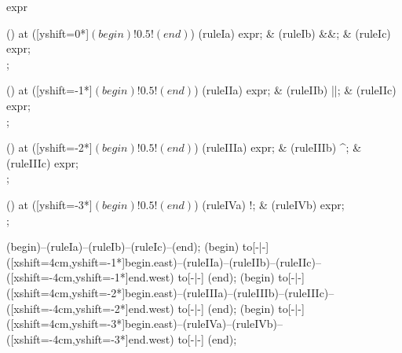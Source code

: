 \begin{syntax}{expr}
  
  \node[sequence] () at ([yshift=0*\syntaxruledist]$(begin)!0.5!(end)$) {
    \node[nonterminal] (ruleIa) {expr};
    &
    \node[terminal]    (ruleIb) {\&\&};
    &
    \node[nonterminal] (ruleIc) {expr};
    \\
  };
  
  \node[sequence] () at ([yshift=-1*\syntaxruledist]$(begin)!0.5!(end)$) {
    \node[nonterminal] (ruleIIa) {expr};
    &
    \node[terminal]    (ruleIIb) {||};
    &
    \node[nonterminal] (ruleIIc) {expr};
    \\
  };
  
  \node[sequence] () at ([yshift=-2*\syntaxruledist]$(begin)!0.5!(end)$) {
    \node[nonterminal] (ruleIIIa) {expr};
    &
    \node[terminal]    (ruleIIIb) {\^{}};
    &
    \node[nonterminal] (ruleIIIc) {expr};
    \\
  };
  
  \node[sequence] () at ([yshift=-3*\syntaxruledist]$(begin)!0.5!(end)$) {
    \node[terminal]    (ruleIVa) {!};
    &
    \node[nonterminal] (ruleIVb) {expr};
    \\
  };
  
  \draw[path] (begin)--(ruleIa)--(ruleIb)--(ruleIc)--(end);
  \draw[path] (begin) to[-|-] ([xshift=4cm,yshift=-1*\syntaxruledist]begin.east)--(ruleIIa)--(ruleIIb)--(ruleIIc)--([xshift=-4cm,yshift=-1*\syntaxruledist]end.west) to[-|-] (end);
  \draw[path] (begin) to[-|-] ([xshift=4cm,yshift=-2*\syntaxruledist]begin.east)--(ruleIIIa)--(ruleIIIb)--(ruleIIIc)--([xshift=-4cm,yshift=-2*\syntaxruledist]end.west) to[-|-] (end);
  \draw[path] (begin) to[-|-] ([xshift=4cm,yshift=-3*\syntaxruledist]begin.east)--(ruleIVa)--(ruleIVb)--([xshift=-4cm,yshift=-3*\syntaxruledist]end.west) to[-|-] (end);
\end{syntax}
